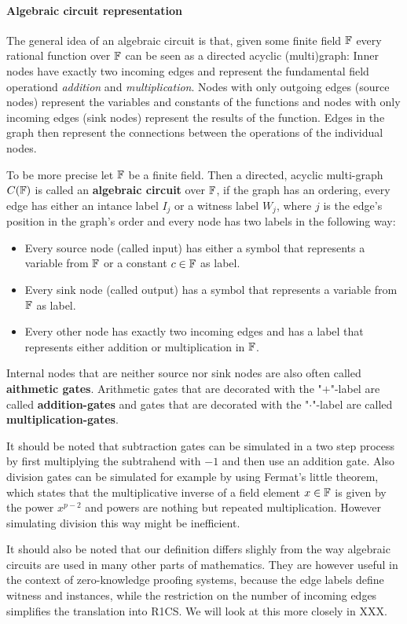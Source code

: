 \paragraph{Algebraic circuit representation}
The general idea of an algebraic circuit is that, given some finite field $\mathbb{F}$ every rational function over $\mathbb{F}$ can be seen as a directed acyclic (multi)graph: Inner nodes have exactly two incoming edges and represent the fundamental field operationd \textit{addition} and \textit{multiplication}. Nodes with only outgoing edges (source nodes) represent the variables and constants of the functions and nodes with only incoming edges (sink nodes) represent the results of the function. Edges in the graph then represent the connections between the operations of the individual nodes.

To be more precise let $\mathbb{F}$ be a finite field. Then a directed, acyclic multi-graph $C(\mathbb{F})$ is called an \textbf{algebraic circuit} over $\mathbb{F}$, if the graph has an ordering, every edge has either an intance label $I_j$ or a witness label $W_j$, where $j$ is the edge's position in the graph's order and every node has two labels in the following way:
\begin{itemize}
\item Every source node (called input) has either a symbol that represents a variable from $\mathbb{F}$ or a constant $c\in\mathbb{F}$ as label.
\item Every sink node (called output) has a symbol that represents a variable from $\mathbb{F}$ as label.
\item Every other node has exactly two incoming edges and has a label that represents either addition or multiplication in $\mathbb{F}$.
\end{itemize}
Internal nodes that are neither source nor sink nodes are also often called \textbf{aithmetic gates}. Arithmetic gates that are decorated with the "$+$"-label are called \textbf{addition-gates} and gates that are decorated with the "$\cdot$"-label are called \textbf{multiplication-gates}.

It should be noted that subtraction gates can be simulated in a two step process by first multiplying the subtrahend with $-1$ and then use an addition gate. Also division gates can be simulated for example by using Fermat's little theorem, which states that the multiplicative inverse of a field element $x\in\mathbb{F}$ is given by the power $x^{p-2}$ and powers are nothing but repeated multiplication. However simulating division this way might be inefficient.

It should also be noted that our definition differs slighly from the way algebraic circuits are used in many other parts of mathematics. They are however useful in the context of zero-knowledge proofing systems, because the edge labels define witness and instances, while the restriction on the number of incoming edges simplifies the translation into R1CS. We will look at this more closely in XXX.

